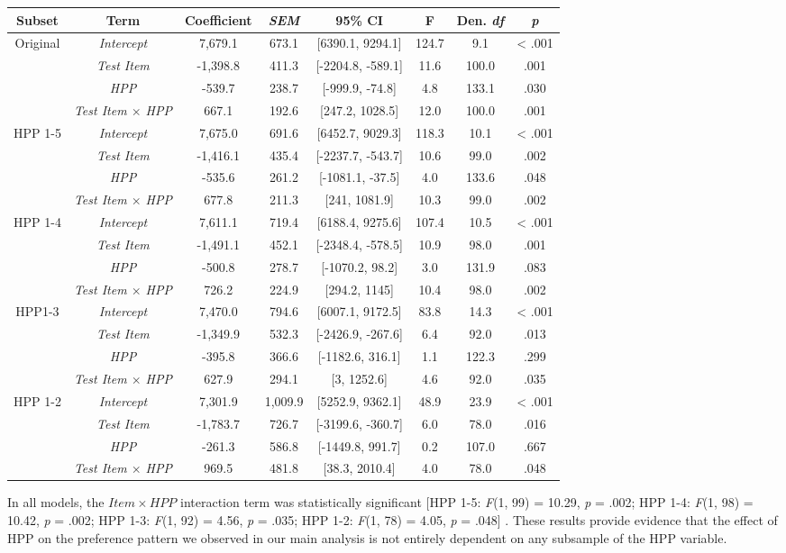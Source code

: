 \begin{appendix}
\begin{longtable}[]{@{}cccccccc@{}}
\toprule
\textbf{Subset} & \textbf{Term} & \textbf{Coefficient} &
\textbf{\emph{SEM}} & \textbf{95\% CI} & \textbf{F} & \textbf{Den.
\emph{df}} & \textbf{\emph{p}}\tabularnewline
\midrule
\endhead
Original & \emph{Intercept} & 7,679.1 & 673.1 & {[}6390.1, 9294.1{]} &
124.7 & 9.1 & \textless{} .001\tabularnewline
& \emph{Test Item} & -1,398.8 & 411.3 & {[}-2204.8, -589.1{]} & 11.6 &
100.0 & .001\tabularnewline
& \emph{HPP} & -539.7 & 238.7 & {[}-999.9, -74.8{]} & 4.8 & 133.1 &
.030\tabularnewline
& \emph{Test Item \(\times\) HPP} & 667.1 & 192.6 & {[}247.2, 1028.5{]}
& 12.0 & 100.0 & .001\tabularnewline
HPP 1-5 & \emph{Intercept} & 7,675.0 & 691.6 & {[}6452.7, 9029.3{]} &
118.3 & 10.1 & \textless{} .001\tabularnewline
& \emph{Test Item} & -1,416.1 & 435.4 & {[}-2237.7, -543.7{]} & 10.6 &
99.0 & .002\tabularnewline
& \emph{HPP} & -535.6 & 261.2 & {[}-1081.1, -37.5{]} & 4.0 & 133.6 &
.048\tabularnewline
& \emph{Test Item \(\times\) HPP} & 677.8 & 211.3 & {[}241, 1081.9{]} &
10.3 & 99.0 & .002\tabularnewline
HPP 1-4 & \emph{Intercept} & 7,611.1 & 719.4 & {[}6188.4, 9275.6{]} &
107.4 & 10.5 & \textless{} .001\tabularnewline
& \emph{Test Item} & -1,491.1 & 452.1 & {[}-2348.4, -578.5{]} & 10.9 &
98.0 & .001\tabularnewline
& \emph{HPP} & -500.8 & 278.7 & {[}-1070.2, 98.2{]} & 3.0 & 131.9 &
.083\tabularnewline
& \emph{Test Item \(\times\) HPP} & 726.2 & 224.9 & {[}294.2, 1145{]} &
10.4 & 98.0 & .002\tabularnewline
HPP1-3 & \emph{Intercept} & 7,470.0 & 794.6 & {[}6007.1, 9172.5{]} &
83.8 & 14.3 & \textless{} .001\tabularnewline
& \emph{Test Item} & -1,349.9 & 532.3 & {[}-2426.9, -267.6{]} & 6.4 &
92.0 & .013\tabularnewline
& \emph{HPP} & -395.8 & 366.6 & {[}-1182.6, 316.1{]} & 1.1 & 122.3 &
.299\tabularnewline
& \emph{Test Item \(\times\) HPP} & 627.9 & 294.1 & {[}3, 1252.6{]} &
4.6 & 92.0 & .035\tabularnewline
HPP 1-2 & \emph{Intercept} & 7,301.9 & 1,009.9 & {[}5252.9, 9362.1{]} &
48.9 & 23.9 & \textless{} .001\tabularnewline
& \emph{Test Item} & -1,783.7 & 726.7 & {[}-3199.6, -360.7{]} & 6.0 &
78.0 & .016\tabularnewline
& \emph{HPP} & -261.3 & 586.8 & {[}-1449.8, 991.7{]} & 0.2 & 107.0 &
.667\tabularnewline
& \emph{Test Item \(\times\) HPP} & 969.5 & 481.8 & {[}38.3, 2010.4{]} &
4.0 & 78.0 & .048\tabularnewline
\bottomrule
\end{longtable}

In all models, the \(Item \times HPP\) interaction term was
statistically significant {[}HPP 1-5: \emph{F}(1, 99) = 10.29, \emph{p}
= .002; HPP 1-4: \emph{F}(1, 98) = 10.42, \emph{p} = .002; HPP 1-3:
\emph{F}(1, 92) = 4.56, \emph{p} = .035; HPP 1-2: \emph{F}(1, 78) =
4.05, \emph{p} = .048{]} . These results provide evidence that the
effect of HPP on the preference pattern we observed in our main analysis
is not entirely dependent on any subsample of the HPP variable.


\end{appendix}
